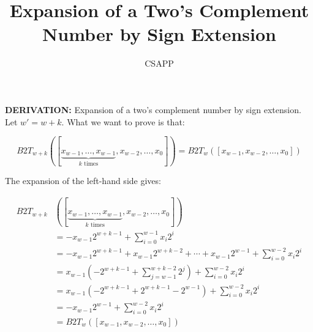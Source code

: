 \documentclass{article}
\title{Expansion of a Two's Complement Number by Sign Extension}
\author{CSAPP}
\begin{document}
\maketitle

\begin{flushleft}
\textbf{\small DERIVATION: } Expansion of a two's complement number by
sign extension.\\[6pt]
Let $w' = w + k$. What we want to prove is that:

\[
    B2T_{w+k}\left([\underbrace{x_{w-1}, \ldots, x_{w-1}}_{k \text{ times}},
    x_{w-2}, \ldots, x_0]\right) = B2T_w([x_{w-1}, x_{w-2}, \ldots, x_0])
\]

\noindent The expansion of the left-hand side gives:

    \begin{align*}
        B2T_{w+k}&\left([\underbrace{x_{w-1}, \ldots, x_{w-1}}_{k \text{ times}},
        x_{w-2}, \ldots, x_0]\right) \\
        &= -x_{w-1} 2^{w+k-1} + \sum_{i=0}^{w-1} x_i 2^i \\
        &= -x_{w-1} 2^{w+k-1} + x_{w-1} 2^{w+k-2} + \cdots + x_{w-1} 2^{w-1}
        + \sum_{i=0}^{w-2} x_i 2^i \\
        &= x_{w-1}\left(-2^{w+k-1} + \sum_{j=w-1}^{w+k-2} 2^j\right)
        + \sum_{i=0}^{w-2} x_i 2^i \\
        &= x_{w-1}\left(-2^{w+k-1} + 2^{w+k-1} - 2^{w-1}\right)
        + \sum_{i=0}^{w-2} x_i 2^i \\
        &= -x_{w-1} 2^{w-1} + \sum_{i=0}^{w-2} x_i 2^i \\
        &= B2T_w([x_{w-1}, x_{w-2}, \ldots, x_0])
    \end{align*}

\end{flushleft}
\end{document}
